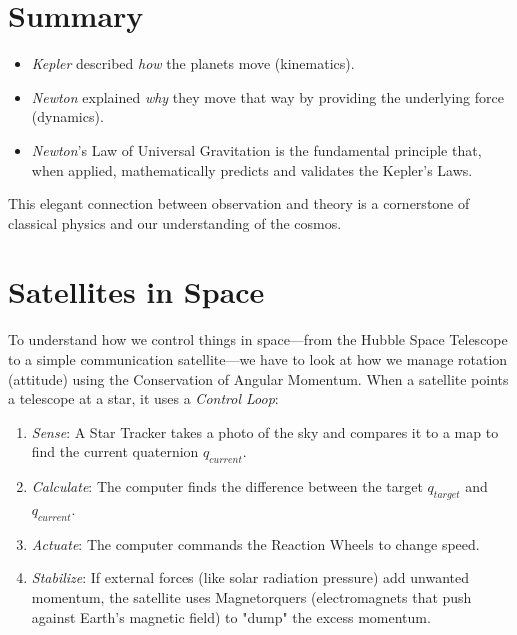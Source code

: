 \documentclass[a4paper,10pt]{article}
\begin{document}
\section{Summary}
\begin{itemize}
\item   \emph{Kepler} described \emph{how} the planets move (kinematics).
\item   \emph{Newton} explained \emph{why} they move that way by providing the underlying force (dynamics).
\item   \emph{Newton}'s Law of Universal Gravitation is the fundamental principle that, when applied, mathematically predicts and validates the Kepler's Laws.
\end{itemize}
This elegant connection between observation and theory is a cornerstone of classical physics and our understanding of the cosmos.
\section{Satellites in Space}
To understand how we control things in space—from the Hubble Space Telescope to a simple communication satellite—we have to look at how we manage rotation (attitude) using the Conservation of Angular Momentum.
When a satellite points a telescope at a star, it uses a \emph{Control Loop}:
\begin{enumerate}
\item \emph{Sense}: A Star Tracker takes a photo of the sky and compares it to a map to find the current quaternion
\(q_{current}\).
\item \emph{Calculate}: The computer finds the difference between the target \(q_{target}\) and \(q_{current}\).
\item \emph{Actuate}: The computer commands the Reaction Wheels to change speed.
\item \emph{Stabilize}: If external forces (like solar radiation pressure) add unwanted momentum, the satellite uses Magnetorquers (electromagnets that push against Earth's magnetic field) to "dump" the excess momentum.
\end{enumerate}
\end{document}
